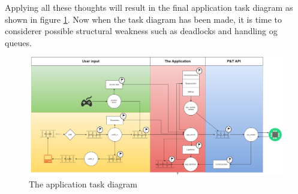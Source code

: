 Applying all these thoughts will result in the final application task diagram as shown in figure \ref{fig:applicaiton_task_diagram}. Now when the task diagram has been made, it is time to considerer possible structural weakness such as deadlocks and handling og queues. 

\begin{figure}
	\centering
	\includegraphics[scale= 0.4, angle = 90] {Billeder/microcontroller-Task-Diagram}
	\caption{The application task diagram}
	\label{fig:applicaiton_task_diagram}
\end{figure}




